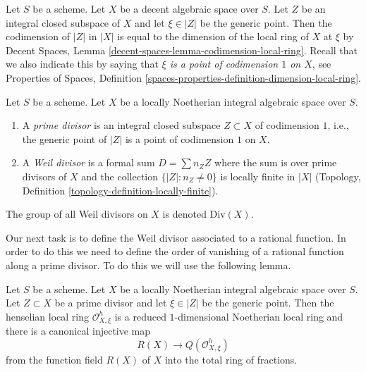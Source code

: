 \noindent
Let $S$ be a scheme. Let $X$ be a decent algebraic space over $S$.
Let $Z$ be an integral closed subspace of $X$ and let
$\xi \in |Z|$ be the generic point. Then the codimension of
$|Z|$ in $|X|$ is equal to the dimension of the local ring
of $X$ at $\xi$ by
Decent Spaces, Lemma \ref{decent-spaces-lemma-codimension-local-ring}.
Recall that we also indicate this by saying that
{\it $\xi$ is a point of codimension $1$ on $X$}, see
Properties of Spaces, Definition
\ref{spaces-properties-definition-dimension-local-ring}.

\begin{definition}
\label{definition-Weil-divisor}
Let $S$ be a scheme.
Let $X$ be a locally Noetherian integral algebraic space over $S$.
\begin{enumerate}
\item A {\it prime divisor} is an integral closed subspace $Z \subset X$
of codimension $1$, i.e., the generic point of $|Z|$ is a point
of codimension $1$ on $X$.
\item A {\it Weil divisor} is a formal sum $D = \sum n_Z Z$ where
the sum is over prime divisors of $X$ and the collection
$\{|Z| : n_Z \not = 0\}$ is locally finite in $|X|$
(Topology, Definition \ref{topology-definition-locally-finite}).
\end{enumerate}
The group of all Weil divisors on $X$ is denoted $\text{Div}(X)$.
\end{definition}

\noindent
Our next task is to define the Weil divisor associated to a rational
function. In order to do this we need to define the order of vanishing of a
rational function along a prime divisor. To do this we will use the
following lemma.

\begin{lemma}
\label{lemma-order-vanishing}
Let $S$ be a scheme. Let $X$ be a locally Noetherian integral algebraic space
over $S$. Let $Z \subset X$ be a prime divisor and let $\xi \in |Z|$ be
the generic point. Then the henselian local ring $\mathcal{O}_{X, \xi}^h$
is a reduced $1$-dimensional Noetherian local ring and
there is a canonical injective map
$$
R(X) \longrightarrow Q(\mathcal{O}_{X, \xi}^h)
$$
from the function field $R(X)$ of $X$ into the total ring of fractions.
\end{lemma}

